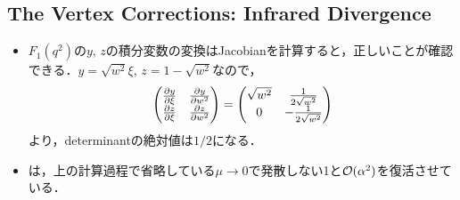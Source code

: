 \subsection{The Vertex Corrections: Infrared Divergence}
\begin{itemize}
	\item $F_1(q^2)$の$y$, $z$の積分変数の変換はJacobianを計算すると，正しいことが確認できる．$y = \sqrt{w^2}\xi$, $z = 1-\sqrt{w^2}$なので，
	\begin{equation}
	\displaystyle
	\begin{pmatrix}
	\pdv{y}{\xi} & \pdv{y}{w^2}\\
	\pdv{z}{\xi} & \pdv{z}{w^2}
	\end{pmatrix}
	=
	\begin{pmatrix}
		\sqrt{w^2} & \frac{1}{2\sqrt{w^2}}\\
		0 & -\frac{1}{2\sqrt{w^2}}
	\end{pmatrix}
	\end{equation}
	より，determinantの絶対値は$1/2$になる．
	\item {}は，上の計算過程で省略している$\mu \to 0$で発散しない1と$\mathcal{O}(\alpha^2)$を復活させている．
\end{itemize}
